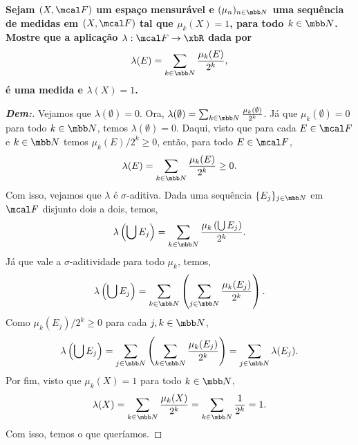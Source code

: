 \biglinend
\newpage 
{}
\bigline 
\textbf{
  Sejam $(X, \mcal F)$ um espaço mensurável e $(\mu_n)_{n \in \mbb N}$ uma sequência 
  de medidas em $(X, \mcal F)$ tal que $\mu_k(X) = 1$, para todo $k \in \mbb N$. 
  Mostre que a aplicação $\lambda: \mcal F \rightarrow \xbR$ dada por 
\begin{align*}
  \lambda(E) = \sum_{k \in \mbb N} \frac{\mu_k(E)}{2^k},
\end{align*}
é uma medida e $\lambda(X) = 1$.
}
\begin{proof}[\textbf{Dem:}] Vejamos que $\lambda(\emptyset) = 0$. 
Ora, $\lambda(\emptyset) = \sum_{k \in \mbb N} \frac{\mu_k(\emptyset)}{2^k}$. Já que 
  $\mu_k(\emptyset) = 0$ para todo $k \in \mbb N$, temos $\lambda(\emptyset) = 0$.
  Daqui, visto que para cada $E \in \mcal F$ e $k \in \mbb N$ temos $\mu_k(E)/2^k \ge 0$, 
então, para todo $E \in \mcal F$,
  \begin{align*}
    \lambda(E) = \sum_{k \in \mbb N} \frac{\mu_k(E)}{2^k} \ge 0.
  \end{align*}
  Com isso, vejamos que $\lambda$ é $\sigma$-aditiva. Dada uma sequência 
  $\{E_j\}_{j \in \mbb N}$ em $\mcal F$ disjunto dois a dois, temos, 
  \begin{align*}
    \lambda\left(\bigcup E_j\right) = 
    \sum_{k \in \mbb N} \frac{\mu_k \left(\bigcup E_j\right)}{2^k}.
  \end{align*}
  Já que vale a $\sigma$-aditividade para todo $\mu_k$, temos,
  \begin{align*}
    \lambda\left(\bigcup E_j\right) = 
    \sum_{k \in \mbb N}\left(\sum_{j \in \mbb N} \frac{\mu_k (E_j)}{2^k} \right).
  \end{align*}
  Como $\mu_k(E_j)/2^k \ge 0$ para cada $j,k \in \mbb N$,
 \begin{align*}
    \lambda\left(\bigcup E_j\right) = 
    \sum_{j \in \mbb N}\left(\sum_{k \in \mbb N} \frac{\mu_k (E_j)}{2^k} \right) = 
    \sum_{j \in \mbb N}\lambda(E_j).
  \end{align*}
 Por fim, visto que $\mu_k(X) = 1$ para todo $k \in \mbb N$, 
\begin{align*}
  \lambda(X) = \sum_{k \in \mbb N} \frac{\mu_k(X)}{2^k} 
  = \sum_{k \in \mbb N} \frac{1}{2^k} = 1. 
\end{align*}
Com isso, temos o que queríamos.
\end{proof}

